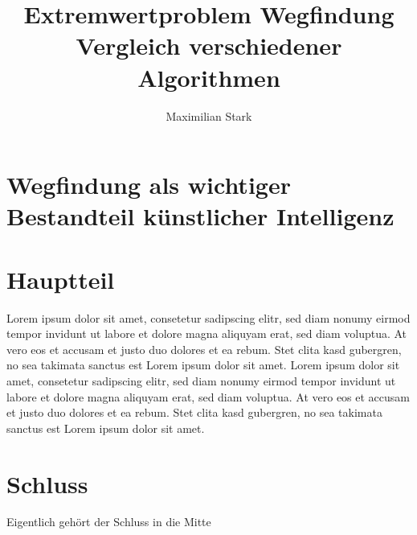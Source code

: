 \documentclass[12pt]{article}
\begin{document}
\title{Extremwertproblem Wegfindung \\  \normalsize{\enspace Vergleich verschiedener Algorithmen}}

\author{Maximilian Stark}

\maketitle
\thispagestyle{empty}
\clearpage

\tableofcontents
\clearpage

\section{Wegfindung als wichtiger Bestandteil künstlicher Intelligenz}

\newpage
\section{Hauptteil}
Lorem ipsum dolor sit amet, consetetur sadipscing elitr, sed diam nonumy eirmod tempor invidunt ut labore et dolore magna aliquyam erat, sed diam voluptua. At vero eos et accusam et justo duo dolores et ea rebum. Stet clita kasd gubergren, no sea takimata sanctus est Lorem ipsum dolor sit amet. Lorem ipsum dolor sit amet, consetetur sadipscing elitr, sed diam nonumy eirmod tempor invidunt ut labore et dolore magna aliquyam erat, sed diam voluptua. At vero eos et accusam et justo duo dolores et ea rebum. Stet clita kasd gubergren, no sea takimata sanctus est Lorem ipsum dolor sit amet.
\newpage

\section{Schluss}
Eigentlich gehört der Schluss in die Mitte
\end{document}
